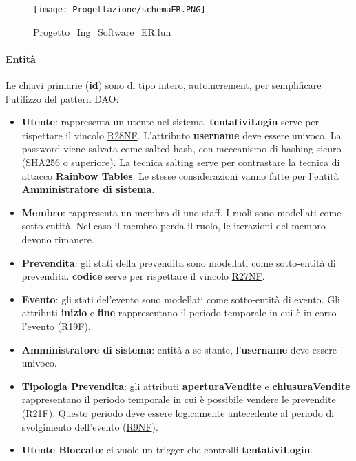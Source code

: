 \documentclass[a4paper]{article}
\begin{document}
\begin{figure}[H]
    \texttt{[image: Progettazione/schemaER.PNG]}
    \centering
    \caption{Progetto\_Ing\_Software\_ER.lun}
\end{figure}

\paragraph{Entità} Le chiavi primarie (\textbf{id}) sono di tipo intero, autoincrement, per semplificare l'utilizzo del pattern DAO:

\begin{itemize}
    \item \textbf{Utente}: rappresenta un utente nel sistema. \textbf{tentativiLogin} serve per rispettare il vincolo \hyperlink{R28NF}{R28NF}. L'attributo \textbf{username} deve essere univoco. La password viene salvata come salted hash, con meccanismo di hashing sicuro (SHA256 o superiore). La tecnica salting serve per contrastare la tecnica di attacco \textbf{Rainbow Tables}. Le stesse considerazioni vanno fatte per l'entità \textbf{Amministratore di sistema}.
    \item \textbf{Membro}: rappresenta un membro di uno staff. I ruoli sono modellati come sotto entità. Nel caso il membro perda il ruolo, le iterazioni del membro devono rimanere.
    \item \textbf{Prevendita}: gli stati della prevendita sono modellati come sotto-entità di prevendita. \textbf{codice} serve per rispettare il vincolo \hyperlink{R27NF}{R27NF}.
    \item \textbf{Evento}: gli stati del'evento sono modellati come sotto-entità di evento. Gli attributi \textbf{inizio} e \textbf{fine} rappresentano il periodo temporale in cui è in corso l'evento (\hyperlink{R19F}{R19F}).
    \item \textbf{Amministratore di sistema}: entità a se stante, l'\textbf{username} deve essere univoco.
    \item \textbf{Tipologia Prevendita}: gli attributi \textbf{aperturaVendite} e \textbf{chiusuraVendite} rappresentano il periodo temporale in cui è possibile vendere le prevendite (\hyperlink{R21F}{R21F}). Questo periodo deve essere logicamente antecedente al periodo di svolgimento dell'evento (\hyperlink{R9NF}{R9NF}).
    \item \textbf{Utente Bloccato}: ci vuole un trigger che controlli \textbf{tentativiLogin}.
\end{itemize}
\end{document}
